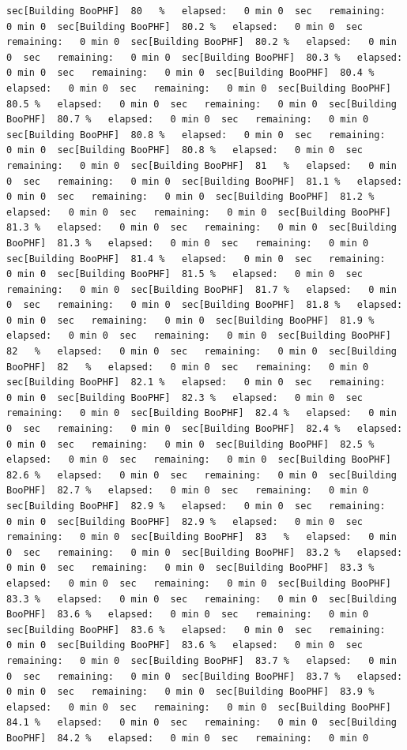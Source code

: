 \documentclass[
]{book}
\begin{document}
\begin{verbatim}
sec[Building BooPHF]  80   %   elapsed:   0 min 0  sec   remaining:   0 min 0  sec[Building BooPHF]  80.2 %   elapsed:   0 min 0  sec   remaining:   0 min 0  sec[Building BooPHF]  80.2 %   elapsed:   0 min 0  sec   remaining:   0 min 0  sec[Building BooPHF]  80.3 %   elapsed:   0 min 0  sec   remaining:   0 min 0  sec[Building BooPHF]  80.4 %   elapsed:   0 min 0  sec   remaining:   0 min 0  sec[Building BooPHF]  80.5 %   elapsed:   0 min 0  sec   remaining:   0 min 0  sec[Building BooPHF]  80.7 %   elapsed:   0 min 0  sec   remaining:   0 min 0  sec[Building BooPHF]  80.8 %   elapsed:   0 min 0  sec   remaining:   0 min 0  sec[Building BooPHF]  80.8 %   elapsed:   0 min 0  sec   remaining:   0 min 0  sec[Building BooPHF]  81   %   elapsed:   0 min 0  sec   remaining:   0 min 0  sec[Building BooPHF]  81.1 %   elapsed:   0 min 0  sec   remaining:   0 min 0  sec[Building BooPHF]  81.2 %   elapsed:   0 min 0  sec   remaining:   0 min 0  sec[Building BooPHF]  81.3 %   elapsed:   0 min 0  sec   remaining:   0 min 0  sec[Building BooPHF]  81.3 %   elapsed:   0 min 0  sec   remaining:   0 min 0  sec[Building BooPHF]  81.4 %   elapsed:   0 min 0  sec   remaining:   0 min 0  sec[Building BooPHF]  81.5 %   elapsed:   0 min 0  sec   remaining:   0 min 0  sec[Building BooPHF]  81.7 %   elapsed:   0 min 0  sec   remaining:   0 min 0  sec[Building BooPHF]  81.8 %   elapsed:   0 min 0  sec   remaining:   0 min 0  sec[Building BooPHF]  81.9 %   elapsed:   0 min 0  sec   remaining:   0 min 0  sec[Building BooPHF]  82   %   elapsed:   0 min 0  sec   remaining:   0 min 0  sec[Building BooPHF]  82   %   elapsed:   0 min 0  sec   remaining:   0 min 0  sec[Building BooPHF]  82.1 %   elapsed:   0 min 0  sec   remaining:   0 min 0  sec[Building BooPHF]  82.3 %   elapsed:   0 min 0  sec   remaining:   0 min 0  sec[Building BooPHF]  82.4 %   elapsed:   0 min 0  sec   remaining:   0 min 0  sec[Building BooPHF]  82.4 %   elapsed:   0 min 0  sec   remaining:   0 min 0  sec[Building BooPHF]  82.5 %   elapsed:   0 min 0  sec   remaining:   0 min 0  sec[Building BooPHF]  82.6 %   elapsed:   0 min 0  sec   remaining:   0 min 0  sec[Building BooPHF]  82.7 %   elapsed:   0 min 0  sec   remaining:   0 min 0  sec[Building BooPHF]  82.9 %   elapsed:   0 min 0  sec   remaining:   0 min 0  sec[Building BooPHF]  82.9 %   elapsed:   0 min 0  sec   remaining:   0 min 0  sec[Building BooPHF]  83   %   elapsed:   0 min 0  sec   remaining:   0 min 0  sec[Building BooPHF]  83.2 %   elapsed:   0 min 0  sec   remaining:   0 min 0  sec[Building BooPHF]  83.3 %   elapsed:   0 min 0  sec   remaining:   0 min 0  sec[Building BooPHF]  83.3 %   elapsed:   0 min 0  sec   remaining:   0 min 0  sec[Building BooPHF]  83.6 %   elapsed:   0 min 0  sec   remaining:   0 min 0  sec[Building BooPHF]  83.6 %   elapsed:   0 min 0  sec   remaining:   0 min 0  sec[Building BooPHF]  83.6 %   elapsed:   0 min 0  sec   remaining:   0 min 0  sec[Building BooPHF]  83.7 %   elapsed:   0 min 0  sec   remaining:   0 min 0  sec[Building BooPHF]  83.7 %   elapsed:   0 min 0  sec   remaining:   0 min 0  sec[Building BooPHF]  83.9 %   elapsed:   0 min 0  sec   remaining:   0 min 0  sec[Building BooPHF]  84.1 %   elapsed:   0 min 0  sec   remaining:   0 min 0  sec[Building BooPHF]  84.2 %   elapsed:   0 min 0  sec   remaining:   0 min 0  
\end{verbatim}
\end{document}
